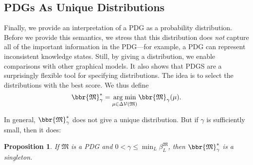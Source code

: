 \documentclass{article}
\theoremstyle{plain}
\newtheorem{prop}[theorem]{Proposition}
\theoremstyle{definition}
\theoremstyle{remark}
\DeclareMathOperator*{\argmin}{arg\;min}
\newcommand{\V}{\mathcal V}
\newcommand{\dg}[1]{\mathfrak{#1}}
\numberwithin{equation}{section}
\begin{document}
    \subsection{PDGs As Unique Distributions}\label{sec:uniq-dist-semantics}

    Finally, we provide an interpretation of a PDG as a probability distribution.  
    Before we provide this semantics, we stress that
    this distribution does \emph{not} capture all of the important
    information in the PDG---for example, a PDG
    can represent inconsistent knowledge states. 
	Still,
	by giving a distribution, we enable comparisons with other
        graphical models. 
	It also shows that PDGS are a surprisingly flexible
        tool for specifying distributions. 
        The idea is to select the distributions with the best score.
We thus define 
\begin{equation}
\bbr{\dg M}_\gamma^* = \argmin_{\mu \in
				   \Delta\V(\dg M)} \bbr{\dg M}_\gamma(\mu).
\end{equation}   

In general, $\bbr{\dg M}_\gamma^*$ does not give a unique
distribution.  But if $\gamma$ is sufficiently small, then it does:
\begin{prop}\label{prop:sem3}
  If $\dg M$ is a PDG and
$0 < \gamma
 	\leq \min_L \beta_L^{\dg M}$, then
  $\bbr{\dg M}_\gamma^*$ is a singleton.
\end{prop}
\end{document}
